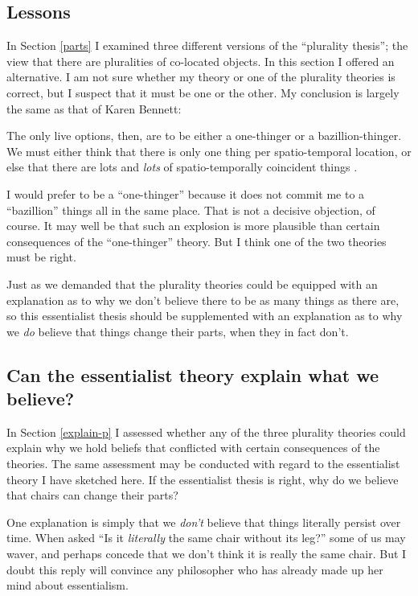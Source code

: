 \documentclass[12pt,twoside]{reedfancy}
\newenvironment{squote}{%
	\begin{spacing}{1}
	\begin{list}{}{%
	\setlength{\labelwidth}{0pt}%
	\rightmargin\leftmargin%
	}
	\item\relax
	}{%
	\end{list}%
	\end{spacing}
	}
\begin{document}
\begin{spacing}{1.25}
\section{Lessons}
\label{lessons-e}
In Section \ref{parts} I examined three different versions of the
``plurality thesis''; the view that there are pluralities of
co-located objects.  In this section I offered an alternative.  I am
not sure whether my theory or one of the plurality theories is
correct, but I suspect that it must be one or the other.  My
conclusion is largely the same as that of Karen Bennett:

\begin{squote}
The only live options, then, are to be either a one-thinger or a
bazillion-thinger.  We must either think that there is only one thing per
spatio-temporal location, or else that there are lots and \emph{lots} of
spatio-temporally coincident things \citeyearpar[358]{bennett2004}.
\end{squote}

I would prefer to be a ``one-thinger'' because it does not commit me
to a ``bazillion'' things all in the same place.  That is not a
decisive objection, of course.  It may well be that such an explosion
is more plausible than certain consequences of the ``one-thinger''
theory.  But I think one of the two theories must be right.

Just as we demanded that the plurality theories could be equipped with
an explanation as to why we don't believe there to be as many things
as there are, so this essentialist thesis should be supplemented with
an explanation as to why we {\em do} believe that things change their
parts, when they in fact don't.

\subsection{Can the essentialist theory explain what we believe?}
\label{explain-e}
In Section \ref{explain-p} I assessed whether any of the three
plurality theories could explain why we hold beliefs that conflicted
with certain consequences of the theories.  The same assessment may be
conducted with regard to the essentialist theory I have sketched here.
If the essentialist thesis is right, why do we believe that chairs can
change their parts?

One explanation is simply that we {\em don't} believe that things
literally persist over time.  When asked ``Is it {\em literally} the
same chair without its leg?'' some of us may waver, and perhaps
concede that we don't think it is really the same chair.  But I doubt
this reply will convince any philosopher who has already made up her
mind about essentialism.


\end{spacing}
\end{document}
